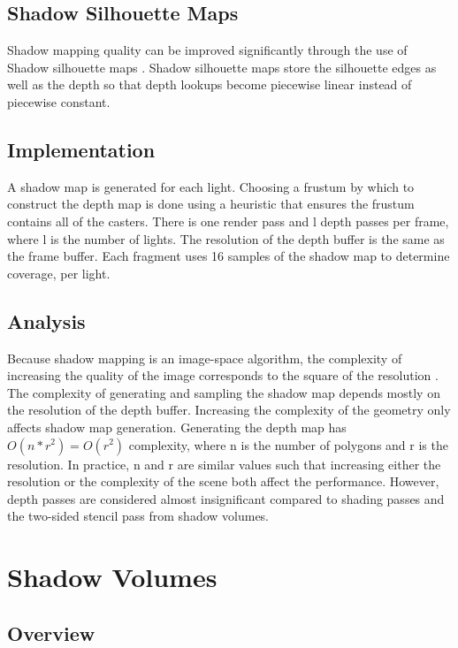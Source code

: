 \documentclass[12pt]{article}
\begin{document}
\subsection{Shadow Silhouette Maps}

Shadow mapping quality can be improved significantly through the use of Shadow silhouette maps \cite{Sen:2003:SSM:882262.882301}. Shadow silhouette maps store the silhouette edges as well as the depth so that depth lookups become piecewise linear instead of piecewise constant.

\subsection{Implementation}

A shadow map is generated for each light. Choosing a frustum by which to construct the depth map is done using a heuristic that ensures the frustum contains all of the casters. There is one render pass and l depth passes per frame, where l is the number of lights. The resolution of the depth buffer is the same as the frame buffer. Each fragment uses 16 samples of the shadow map to determine coverage, per light.

\subsection{Analysis}

Because shadow mapping is an image-space algorithm, the complexity of increasing the quality of the image corresponds to the square of the resolution \cite{Williams:1978:CCS:800248.807402}.
The complexity of generating and sampling the shadow map depends mostly on the resolution of the depth buffer. Increasing the complexity of the geometry only affects shadow map generation.
Generating the depth map has \(O(n*r^{2}) = O(r^{2})\) complexity, where n is the number of polygons and r is the resolution.
In practice, n and r are similar values such that increasing either the resolution or the complexity of the scene both affect the performance. However, depth passes are considered almost insignificant compared to shading passes and the two-sided stencil pass from shadow volumes. 

\section{Shadow Volumes}

\subsection{Overview}
\end{document}
